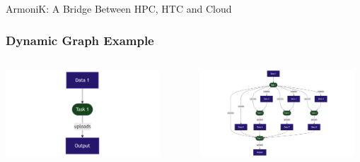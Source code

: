 \documentclass[10pt,aspectratio=1609]{beamer}
\begin{document}
\begin{section}{ArmoniK: A Bridge Between HPC, HTC and Cloud}
  \begin{frame}
    \frametitle{Dynamic Graph Example}
    \begin{columns}[T]
      \begin{column}{0.3\textwidth}
        \centering
        \vspace{1cm}
        \vfill
        \includegraphics[width=0.95\textwidth]{mermaid-dynamic-part1.png}
      \end{column}
      \begin{column}{0.05\textwidth}
        \centering
        \vspace{1.7cm}
        \vfill
        $\Rightarrow$
      \end{column}
      \begin{column}{0.65\textwidth}
        \centering
        \footnotesize
        \includegraphics[width=0.95\textwidth]{mermaid-dynamic-part2.png}
      \end{column}
    \end{columns}
  \end{frame}


\end{section}
\end{document}
